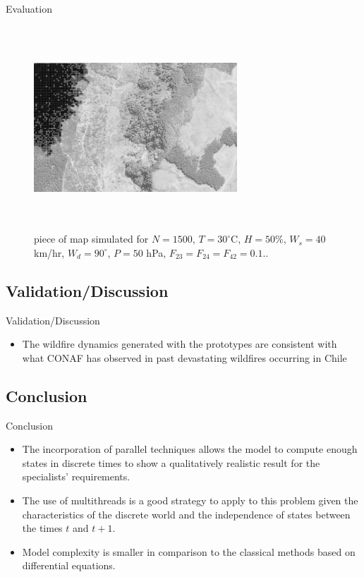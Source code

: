 \documentclass{beamer}
\begin{document}
      \begin{frame}{Evaluation}
        \begin{figure}[!ht]
          \centering
          \includegraphics[width=3in,height=3in,clip,keepaspectratio]{figures/simulation_gray.png}
          \caption{piece of map simulated for $N=1500$, $T=30^{\circ}$C, $H=50$\%, 
              $W_s=40$ km/hr, $W_d=90^{\circ}$, $P=50$ hPa, $F_{23} = F_{24}= F_{42} = 0.1$..}
          \label{fig:simulation}
        \end{figure}
      \end{frame}

      \subsection{Validation/Discussion}
        \begin{frame}{Validation/Discussion}
          \begin{itemize}
            \item<1-> The wildfire dynamics generated with the prototypes are consistent with what 
              CONAF has observed in past devastating wildfires occurring in Chile
          \end{itemize}
        \end{frame}
      
      \subsection{Conclusion}
        \begin{frame}{Conclusion}
          \begin{itemize}
            \item<1-> The incorporation of parallel techniques allows the model to compute enough 
              states in discrete times to show a qualitatively realistic result for the specialists' requirements.
            \item<2-> The use of multithreads is a good strategy to apply to this problem given 
              the characteristics of the discrete world and the independence of states between the 
              times $t$ and $t + 1$.
            \item<3-> Model complexity is smaller in comparison to the classical methods based on differential 
              equations.
          \end{itemize}
        \end{frame}
      
\end{document}

